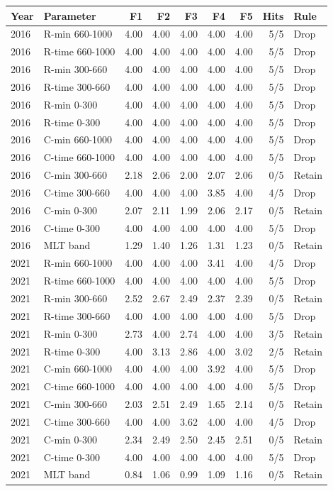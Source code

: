 \begin{tabular}{@{}llrrrrrrl@{}}
\toprule
Year & Parameter & F1 & F2 & F3 & F4 & F5 & Hits & Rule \\
\midrule
2016 & R-min 660-1000 & 4.00 & 4.00 & 4.00 & 4.00 & 4.00 & 5/5 & Drop \\
2016 & R-time 660-1000 & 4.00 & 4.00 & 4.00 & 4.00 & 4.00 & 5/5 & Drop \\
2016 & R-min 300-660 & 4.00 & 4.00 & 4.00 & 4.00 & 4.00 & 5/5 & Drop \\
2016 & R-time 300-660 & 4.00 & 4.00 & 4.00 & 4.00 & 4.00 & 5/5 & Drop \\
2016 & R-min 0-300 & 4.00 & 4.00 & 4.00 & 4.00 & 4.00 & 5/5 & Drop \\
2016 & R-time 0-300 & 4.00 & 4.00 & 4.00 & 4.00 & 4.00 & 5/5 & Drop \\
2016 & C-min 660-1000 & 4.00 & 4.00 & 4.00 & 4.00 & 4.00 & 5/5 & Drop \\
2016 & C-time 660-1000 & 4.00 & 4.00 & 4.00 & 4.00 & 4.00 & 5/5 & Drop \\
2016 & C-min 300-660 & 2.18 & 2.06 & 2.00 & 2.07 & 2.06 & 0/5 & Retain \\
2016 & C-time 300-660 & 4.00 & 4.00 & 4.00 & 3.85 & 4.00 & 4/5 & Drop \\
2016 & C-min 0-300 & 2.07 & 2.11 & 1.99 & 2.06 & 2.17 & 0/5 & Retain \\
2016 & C-time 0-300 & 4.00 & 4.00 & 4.00 & 4.00 & 4.00 & 5/5 & Drop \\
2016 & MLT band & 1.29 & 1.40 & 1.26 & 1.31 & 1.23 & 0/5 & Retain \\
2021 & R-min 660-1000 & 4.00 & 4.00 & 4.00 & 3.41 & 4.00 & 4/5 & Drop \\
2021 & R-time 660-1000 & 4.00 & 4.00 & 4.00 & 4.00 & 4.00 & 5/5 & Drop \\
2021 & R-min 300-660 & 2.52 & 2.67 & 2.49 & 2.37 & 2.39 & 0/5 & Retain \\
2021 & R-time 300-660 & 4.00 & 4.00 & 4.00 & 4.00 & 4.00 & 5/5 & Drop \\
2021 & R-min 0-300 & 2.73 & 4.00 & 2.74 & 4.00 & 4.00 & 3/5 & Retain \\
2021 & R-time 0-300 & 4.00 & 3.13 & 2.86 & 4.00 & 3.02 & 2/5 & Retain \\
2021 & C-min 660-1000 & 4.00 & 4.00 & 4.00 & 3.92 & 4.00 & 5/5 & Drop \\
2021 & C-time 660-1000 & 4.00 & 4.00 & 4.00 & 4.00 & 4.00 & 5/5 & Drop \\
2021 & C-min 300-660 & 2.03 & 2.51 & 2.49 & 1.65 & 2.14 & 0/5 & Retain \\
2021 & C-time 300-660 & 4.00 & 4.00 & 3.62 & 4.00 & 4.00 & 4/5 & Drop \\
2021 & C-min 0-300 & 2.34 & 2.49 & 2.50 & 2.45 & 2.51 & 0/5 & Retain \\
2021 & C-time 0-300 & 4.00 & 4.00 & 4.00 & 4.00 & 4.00 & 5/5 & Drop \\
2021 & MLT band & 0.84 & 1.06 & 0.99 & 1.09 & 1.16 & 0/5 & Retain \\
\bottomrule
\end{tabular}
